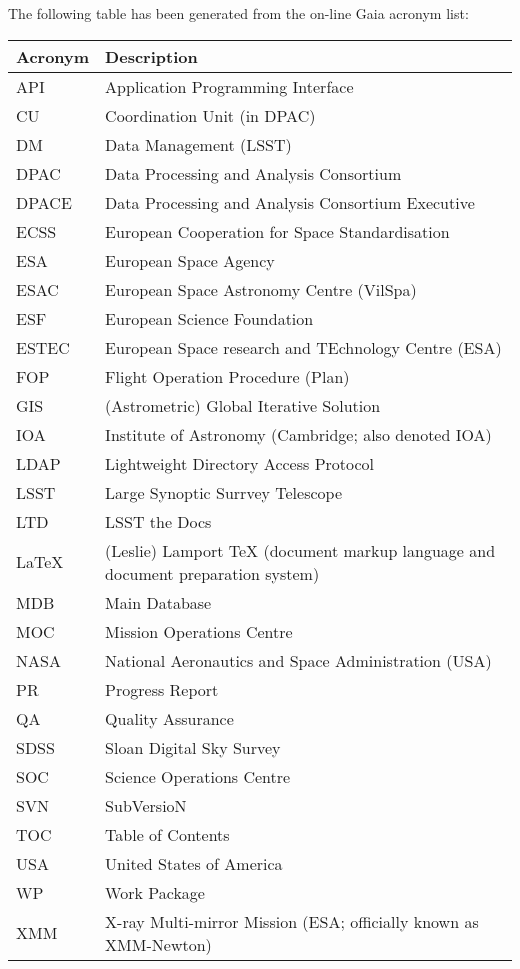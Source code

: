 The following table has been generated from the on-line Gaia acronym list:
\newline\newline%
\addtocounter{table}{-1}
\begin{longtable}{|l|p{}|}\hline 
\textbf{Acronym} & \textbf{Description}  \\\hline
API&Application Programming Interface \\\hline
CU&Coordination Unit (in DPAC) \\\hline
DM&Data Management (LSST) \\\hline
DPAC&Data Processing and Analysis Consortium \\\hline
DPACE&Data Processing and Analysis Consortium Executive \\\hline
ECSS&European Cooperation for Space Standardisation \\\hline
ESA&European Space Agency \\\hline
ESAC&European Space Astronomy Centre (VilSpa) \\\hline
ESF&European Science Foundation \\\hline
ESTEC&European Space research and TEchnology Centre (ESA) \\\hline
FOP&Flight Operation Procedure (Plan) \\\hline
GIS&(Astrometric) Global Iterative Solution \\\hline
IOA&Institute of Astronomy (Cambridge; also denoted IOA) \\\hline
LDAP&Lightweight Directory Access Protocol \\\hline
LSST&Large Synoptic Surrvey Telescope \\\hline
LTD&LSST the Docs \\\hline
LaTeX&(Leslie) Lamport TeX (document markup language and document preparation system) \\\hline
MDB&Main Database \\\hline
MOC&Mission Operations Centre \\\hline
NASA&National Aeronautics and Space Administration (USA) \\\hline
PR&Progress Report \\\hline
QA&Quality Assurance \\\hline
SDSS&Sloan Digital Sky Survey \\\hline
SOC&Science Operations Centre \\\hline
SVN&SubVersioN \\\hline
TOC&Table of Contents \\\hline
USA&United States of America \\\hline
WP&Work Package \\\hline
XMM&X-ray Multi-mirror Mission (ESA; officially known as XMM-Newton) \\\hline
\end{longtable} 

